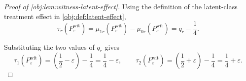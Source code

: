 \begin{proof}[Proof of \cref{obj:lem:witness-latent-effect}]
Using the definition of the latent-class treatment effect in \cref{obj:def:latent-effect},
\[
\tau_r(P_{\varepsilon}^{\mathrm{wit}})
=
\mu_{1r}(P_{\varepsilon}^{\mathrm{wit}})
-
\mu_{0r}(P_{\varepsilon}^{\mathrm{wit}})
=
q_r-\frac14.
\] %

Substituting the two values of \(q_r\) gives
\[
\tau_1(P_{\varepsilon}^{\mathrm{wit}})
=
\left(\frac12-\varepsilon\right)-\frac14
=
\frac14-\varepsilon,
\qquad
\tau_2(P_{\varepsilon}^{\mathrm{wit}})
=
\left(\frac12+\varepsilon\right)-\frac14
=
\frac14+\varepsilon.
\] %
\end{proof}
